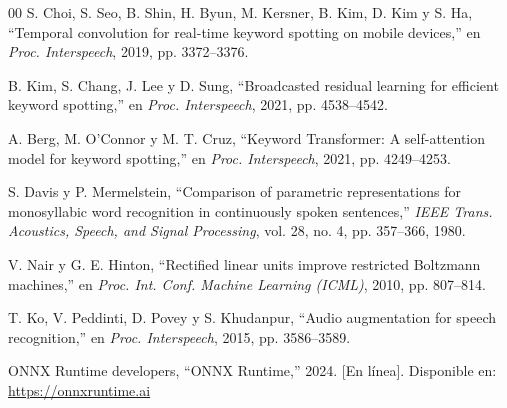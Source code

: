 \documentclass[conference]{IEEEtran}
\begin{document}
\begin{thebibliography}{00}
 S. Choi, S. Seo, B. Shin, H. Byun, M. Kersner, B. Kim, D. Kim y S. Ha, ``Temporal convolution for real-time keyword spotting on mobile devices,'' en \textit{Proc. Interspeech}, 2019, pp. 3372--3376.

 B. Kim, S. Chang, J. Lee y D. Sung, ``Broadcasted residual learning for efficient keyword spotting,'' en \textit{Proc. Interspeech}, 2021, pp. 4538--4542.

 A. Berg, M. O'Connor y M. T. Cruz, ``Keyword Transformer: A self-attention model for keyword spotting,'' en \textit{Proc. Interspeech}, 2021, pp. 4249--4253.

 S. Davis y P. Mermelstein, ``Comparison of parametric representations for monosyllabic word recognition in continuously spoken sentences,'' \textit{IEEE Trans. Acoustics, Speech, and Signal Processing}, vol. 28, no. 4, pp. 357--366, 1980.

 V. Nair y G. E. Hinton, ``Rectified linear units improve restricted Boltzmann machines,'' en \textit{Proc. Int. Conf. Machine Learning (ICML)}, 2010, pp. 807--814.

 T. Ko, V. Peddinti, D. Povey y S. Khudanpur, ``Audio augmentation for speech recognition,'' en \textit{Proc. Interspeech}, 2015, pp. 3586--3589.

 ONNX Runtime developers, ``ONNX Runtime,'' 2024. [En línea]. Disponible en: \url{https://onnxruntime.ai}

\end{thebibliography}
\end{document}
